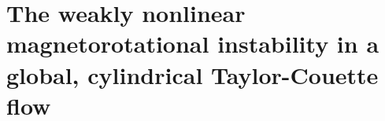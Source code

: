 \chapter[The weakly nonlinear magnetorotational instability in a global, cylindrical Taylor-Couette flow]{The weakly nonlinear magnetorotational instability in a global, cylindrical Taylor-Couette flow\label{ch:mri_global}}
\let\thefootnote\relax{}